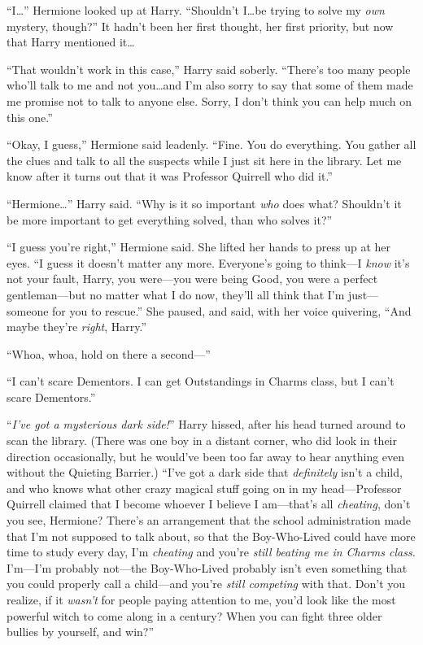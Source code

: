 “I…” Hermione looked up at Harry. “Shouldn’t I…be trying to solve my \emph{own} mystery, though?” It hadn’t been her first thought, her first priority, but now that Harry mentioned it…

“That wouldn’t work in this case,” Harry said soberly. “There’s too many people who’ll talk to me and not you…and I’m also sorry to say that some of them made me promise not to talk to anyone else. Sorry, I don’t think you can help much on this one.”

“Okay, I guess,” Hermione said leadenly. “Fine. You do everything. You gather all the clues and talk to all the suspects while I just sit here in the library. Let me know after it turns out that it was Professor Quirrell who did it.”

“Hermione…” Harry said. “Why is it so important \emph{who} does what? Shouldn’t it be more important to get everything solved, than who solves it?”

“I guess you’re right,” Hermione said. She lifted her hands to press up at her eyes. “I guess it doesn’t matter any more. Everyone’s going to think—I \emph{know} it’s not your fault, Harry, you were—you were being Good, you were a perfect gentleman—but no matter what I do now, they’ll all think that I’m just—someone for you to rescue.” She paused, and said, with her voice quivering, “And maybe they’re \emph{right}, Harry.”

“Whoa, whoa, hold on there a second—”

“I can’t scare Dementors. I can get Outstandings in Charms class, but I can’t scare Dementors.”

“\emph{I’ve got a mysterious dark side!}” Harry hissed, after his head turned around to scan the library. (There was one boy in a distant corner, who did look in their direction occasionally, but he would’ve been too far away to hear anything even without the Quieting Barrier.) “I’ve got a dark side that \emph{definitely} isn’t a child, and who knows what other crazy magical stuff going on in my head—Professor Quirrell claimed that I become whoever I believe I am—that’s all \emph{cheating}, don’t you see, Hermione? There’s an arrangement that the school administration made that I’m not supposed to talk about, so that the Boy-Who-Lived could have more time to study every day, I’m \emph{cheating} and you’re \emph{still beating me in Charms class.} I’m—I’m probably not—the Boy-Who-Lived probably isn’t even something that you could properly call a child—and you’re \emph{still competing} with that. Don’t you realize, if it \emph{wasn’t} for people paying attention to me, you’d look like the most powerful witch to come along in a century? When you can fight three older bullies by yourself, and win?”


